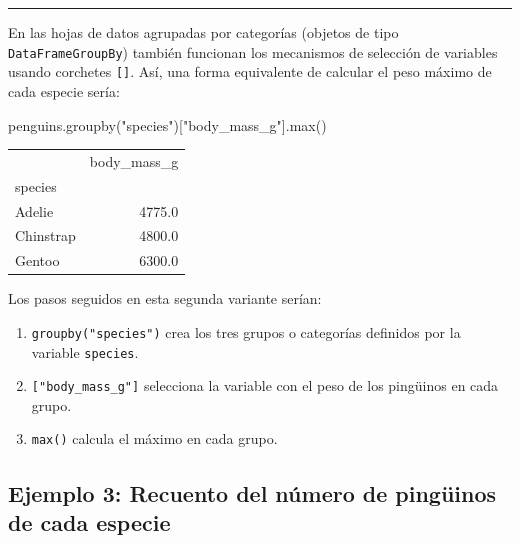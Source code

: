 \documentclass[
  a4paper,
  noprof,
  12pt,
  notoc,
  nosols,
  nobib]{mnye}
\newenvironment{Shaded}{\begin{snugshade}}{\end{snugshade}}
\newcommand{\BuiltInTok}[1]{\textcolor[rgb]{0.00,0.23,0.31}{#1}}
\newcommand{\NormalTok}[1]{\textcolor[rgb]{0.00,0.23,0.31}{#1}}
\newcommand{\StringTok}[1]{\textcolor[rgb]{0.13,0.47,0.30}{#1}}
\theoremstyle{definition}
\theoremstyle{remark}
\begin{document}
\begin{center}\rule{0.5\linewidth}{0.5pt}\end{center}

En las hojas de datos agrupadas por categorías (objetos de tipo
\texttt{DataFrameGroupBy}) también funcionan los mecanismos de selección
de variables usando corchetes \texttt{{[}{]}}. Así, una forma
equivalente de calcular el peso máximo de cada especie sería:

\begin{Shaded}
\begin{Highlighting}[]
\NormalTok{penguins.groupby(}\StringTok{"species"}\NormalTok{)[}\StringTok{"body\_mass\_g"}\NormalTok{].}\BuiltInTok{max}\NormalTok{()}
\end{Highlighting}
\end{Shaded}

\begin{tabular}{lr}
\toprule
{} &  body\_mass\_g \\
species   &              \\
\midrule
Adelie    &       4775.0 \\
Chinstrap &       4800.0 \\
Gentoo    &       6300.0 \\
\bottomrule
\end{tabular}

Los pasos seguidos en esta segunda variante serían:

\begin{enumerate}
\def\labelenumi{\arabic{enumi}.}
\item
  \texttt{groupby("species")} crea los tres grupos o categorías
  definidos por la variable \texttt{species}.
\item
  \texttt{{[}"body\_mass\_g"{]}} selecciona la variable con el peso de
  los pingüinos en cada grupo.
\item
  \texttt{max()} calcula el máximo en cada grupo.
\end{enumerate}

\hypertarget{ejemplo-3-recuento-del-nuxfamero-de-pinguxfcinos-de-cada-especie}{%
\subsection*{Ejemplo 3: Recuento del número de pingüinos de cada
especie}\label{ejemplo-3-recuento-del-nuxfamero-de-pinguxfcinos-de-cada-especie}}
\end{document}
